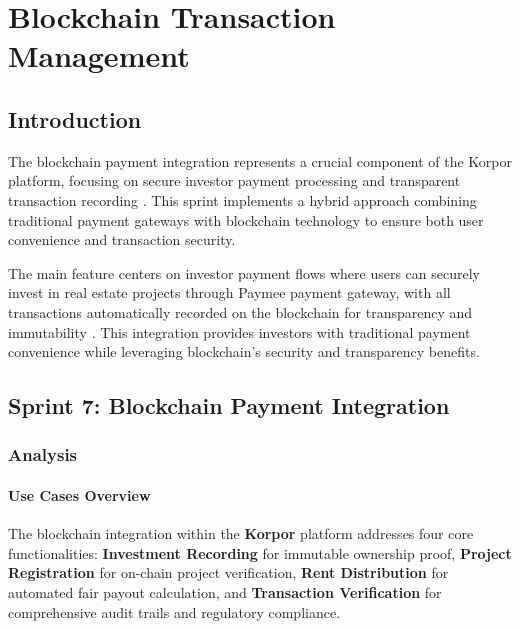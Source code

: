 \chapter{Blockchain Transaction Management}


\section*{Introduction}

The blockchain payment integration represents a crucial component of the Korpor platform, focusing on secure investor payment processing and transparent transaction recording \cite{Nakamoto2008Bitcoin}. This sprint implements a hybrid approach combining traditional payment gateways with blockchain technology to ensure both user convenience and transaction security.

The main feature centers on investor payment flows where users can securely invest in real estate projects through Paymee payment gateway, with all transactions automatically recorded on the blockchain for transparency and immutability \cite{Tapscott2016Blockchain}. This integration provides investors with traditional payment convenience while leveraging blockchain's security and transparency benefits.


\section{Sprint 7: Blockchain Payment Integration}

\subsection{Analysis}
\subsubsection{Use Cases Overview}

The blockchain integration within the \textbf{\textcolor{primary}{Korpor}} platform addresses four core functionalities: \textbf{Investment Recording} for immutable ownership proof, \textbf{Project Registration} for on-chain project verification, \textbf{Rent Distribution} for automated fair payout calculation, and \textbf{Transaction Verification} for comprehensive audit trails and regulatory compliance.

